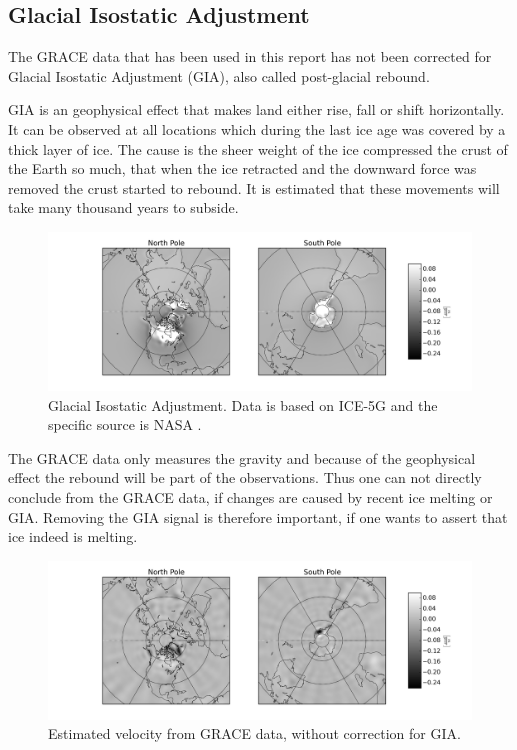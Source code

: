 \subsection{Glacial Isostatic Adjustment}

The GRACE data that has been used in this report has not been corrected for Glacial Isostatic Adjustment (GIA), also called post-glacial rebound.

GIA is an geophysical effect that makes land either rise, fall or shift horizontally. 
It can be observed at all locations which during the last ice age was covered by a thick layer of ice.
The cause is the sheer weight of the ice compressed the crust of the Earth so much, that when the ice retracted and the downward force was removed the crust started to rebound.
It is estimated that these movements will take many thousand years to subside.

\begin{figure}[H]
	\centering
	\includegraphics[width=\textwidth]{figures/gia-pure-adjust}
	\caption{Glacial Isostatic Adjustment. Data is based on ICE-5G and the specific source is NASA \cite{NASA-GIA-download}.}
	\label{fig:gia-pure-adjust}
\end{figure}

The GRACE data only measures the gravity and because of the geophysical effect the rebound will be part of the observations.
Thus one can not directly conclude from the GRACE data, if changes are caused by recent ice melting or GIA. Removing the GIA signal is therefore important, if one wants to assert that ice indeed is melting.

\begin{figure}[H]
	\centering
	\includegraphics[width=\textwidth]{figures/gia-just-vel}
	\caption{Estimated velocity from GRACE data, without correction for GIA.}
	\label{fig:gia-just-vel}
\end{figure}

